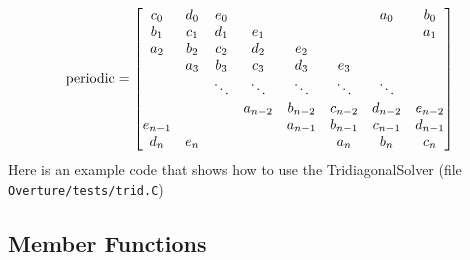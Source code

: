 \[
  {\rm periodic } = 
        \begin{bmatrix}
               c_0 & d_0 & e_0  &       &        &        & a_0    & b_0 \\
               b_1 & c_1 & d_1  & e_1   &        &        &        & a_1 \\
               a_2 & b_2 & c_2  & d_2   &  e_2   &        &        &     \\
                   & a_3 & b_3  & c_3   &  d_3   &  e_3   &        &     \\
                   &     &\ddots&\ddots & \ddots & \ddots & \ddots &          \\ 
                   &     &      &a_{n-2}& b_{n-2}& c_{n-2}& d_{n-2}& e_{n-2}   \\
           e_{n-1} &     &      &       &a_{n-1} & b_{n-1}& c_{n-1}& d_{n-1}   \\
             d_n   & e_n &      &       &        &a_{n  } & b_{n  }& c_{n  }   \\
        \end{bmatrix}
\]
Here is an example code that shows how to use the TridiagonalSolver
(file {\tt Overture/tests/trid.C})
{\footnotesize
{}
}

\subsection{Member Functions}



